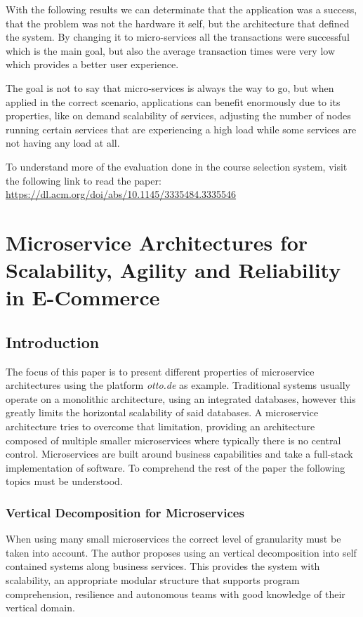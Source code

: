 \documentclass[14pt]{extarticle}
\begin{document}
With the following results we can determinate that the application was a success, that the problem was not the hardware it self, but the architecture that defined the system. By changing it to micro-services all the transactions were successful which is the main goal, but also the average transaction times were very low which provides a better user experience.

The goal is not to say that micro-services is always the way to go, but when applied in the correct scenario, applications can benefit enormously due to its properties, like on demand scalability of services, adjusting the number of nodes running certain services that are experiencing a high load while some services are not having any load at all.

To understand more of the evaluation done in the course selection system, visit the following link to read the paper: \url{https://dl.acm.org/doi/abs/10.1145/3335484.3335546}

\section{Microservice Architectures for Scalability, Agility and Reliability in E-Commerce}

\subsection{Introduction}

The focus of this paper is to present different properties of microservice architectures using the platform \textit{otto.de} as example. Traditional systems usually operate on a monolithic architecture, using an integrated databases, however this greatly limits the horizontal scalability of said databases. A microservice architecture tries to overcome that limitation, providing an architecture composed of multiple smaller microservices where typically there is no central control. Microservices are built around business capabilities and take a full-stack implementation of software. To comprehend the rest of the paper the following topics must be understood.

\subsubsection{Vertical Decomposition for Microservices}

When using many small microservices the correct level of granularity must be taken into account. The author proposes using an vertical decomposition into self contained systems along business services. This provides the system with scalability, an appropriate modular structure that supports program comprehension, resilience and autonomous teams with good knowledge of their vertical domain.
\end{document}
